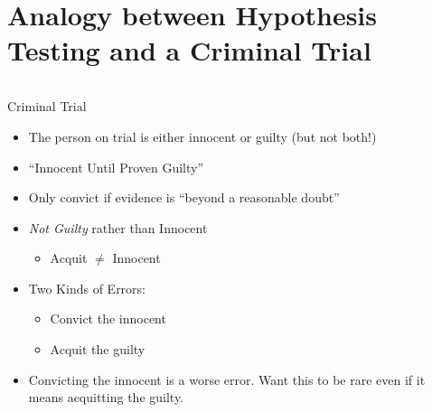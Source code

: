 \section{Analogy between Hypothesis Testing and a Criminal Trial}

\begin{frame}
\footnotesize
\begin{columns}
\begin{column}{6cm} 
   	\begin{block}{Criminal Trial}
	\begin{itemize}
		\item<1-> The person on trial is either innocent or guilty (but not both!)
		\item<2-> ``Innocent Until Proven Guilty''
		\item<3-> Only convict if evidence is ``beyond a reasonable doubt''
		\item<4-> \emph{Not Guilty} rather than Innocent
			\begin{itemize}\footnotesize
				\item<5-> Acquit $\neq$ Innocent
			\end{itemize}
		\item<6-> Two Kinds of Errors:
			\begin{itemize} \footnotesize
				\item<6-> Convict the innocent
				\item<6->  Acquit the guilty
			\end{itemize}
		\item<7-> Convicting the innocent is a worse error. Want this to be rare even if it means acquitting the guilty.	\end{itemize}
\end{block}
   
   
\end{column} 
\begin{column}{6cm} 



\end{column}
\end{columns}
\end{frame}
